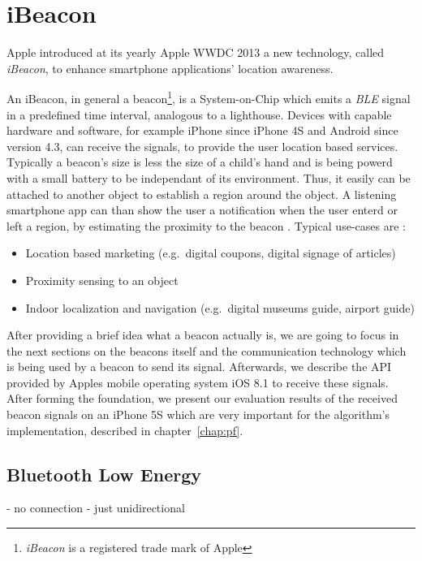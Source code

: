 \chapter{iBeacon} \label{chap:ibeacons}
Apple introduced at its yearly Apple \ac{WWDC} 2013 a new technology, called \textit{iBeacon}, to enhance smartphone applications' location awareness.

An iBeacon, in general a beacon\footnote{\textit{iBeacon} is a registered trade mark of Apple}, is a System-on-Chip which emits a \textit{\ac{BLE}} signal in a predefined time interval, analogous to a lighthouse. %
Devices with capable hardware and software, for example iPhone since iPhone 4S and Android since version 4.3, can receive the signals, to provide the user location based services.
Typically a beacon's size is less the size of a child's hand and is being powerd with a small battery to be independant of its environment.
Thus, it easily can be attached to another object to establish a region around the object.
A listening smartphone app can than show the user a notification when the user enterd or left a region, by estimating the proximity to the beacon \cite{apple:getting_started, binside:ds}.
Typical use-cases are \cite{binside:ds}:
\begin{itemize}
  \item Location based marketing (e.g.\ digital coupons, digital signage of articles)
  \item Proximity sensing to an object
  \item Indoor localization and navigation (e.g.\ digital museums guide, airport guide)
\end{itemize}

After providing a brief idea what a beacon actually is, we are going to focus in the next sections on the beacons itself and the communication technology which is being used by a beacon to send its signal.
Afterwards, we describe the \acs{API} provided by Apples mobile operating system iOS 8.1 to receive these signals.
After forming the foundation, we present our evaluation results of the received beacon signals on an iPhone 5S which are very important for the algorithm's implementation, described in chapter~\ref{chap:pf}.


\section{Bluetooth Low Energy}\label{sec:ble}
- no connection
- just unidirectional


